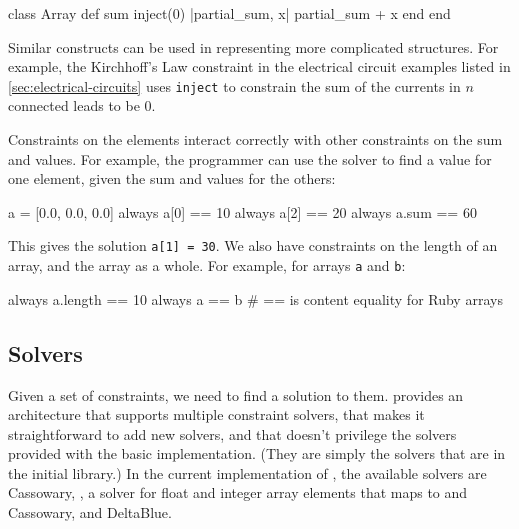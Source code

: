 \begin{code}
class Array
  def sum
    inject(0) { |partial_sum, x| partial_sum + x }
  end
end
\end{code}

Similar constructs can be used in representing more complicated
structures.  For example, the Kirchhoff's Law constraint in the
electrical circuit examples listed in \autoref{sec:electrical-circuits} uses
\lstinline{inject} to constrain the sum of the currents in $n$
connected leads to be 0.


Constraints on the elements interact correctly with other constraints
on the sum and values.  For example, the programmer can use the
solver to find a value for one element, given the sum and values for
the others:

\begin{code}
a = [0.0, 0.0, 0.0]
always { a[0] == 10 }
always { a[2] == 20 }
always { a.sum == 60 }
\end{code}

This gives the solution \lstinline{a[1] = 30}.
We also have constraints on the length of an array, and the array as a
whole.  For example, for arrays \lstinline{a} and \lstinline{b}:

\begin{code}
always { a.length == 10 }
always { a == b } # == is content equality for Ruby arrays
\end{code}


\subsection{Solvers}
\label{sec:solvers}

Given a set of constraints, we need to find a solution to them.
\langname provides an architecture that supports multiple constraint
solvers, that makes it straightforward to add new solvers, and that
doesn't privilege the solvers provided with the basic implementation.
(They are simply the solvers that are in the initial library.)  In the
current implementation of \toolname, the available solvers are
Cassowary, \zthree, a solver for float and integer array elements that
maps to \zthree and Cassowary, and DeltaBlue.

